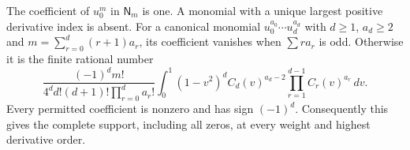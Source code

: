 \begin{theorem}
\label{ung:coefficient}
The coefficient of $u_0^m$ in $\mathsf N_m$ is one. A monomial with
a unique largest positive derivative index is absent. For a canonical
monomial $u_0^{a_0}\cdots u_d^{a_d}$ with $d\ge1$, $a_d\ge2$ and
$m=\sum_{r=0}^d(r+1)a_r$, its coefficient vanishes when
$\sum r a_r$ is odd. Otherwise it is the finite rational number
\begin{equation}\label{ung:beta}
 \boxed{\frac{(-1)^d m!}{4^d d!(d+1)!\prod_{r=0}^d a_r!}
 \int_0^1(1-v^2)^d C_d(v)^{a_d-2}
                         \prod_{r=1}^{d-1}C_r(v)^{a_r}\,dv.}
\end{equation}
Every permitted coefficient is nonzero and has sign $(-1)^d$.
Consequently this gives the complete support, including all zeros,
at every weight and highest derivative order.
\end{theorem}

